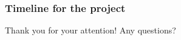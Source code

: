 \documentclass[10pt,xcolor=table]{beamer}
\begin{document}
\begin{frame}
  \frametitle{Timeline for the project}
\begin{table}[tp]
  \caption{Timeline for the project.}
  \label{table:timeline}
  \begin{adjustwidth}{-0.15in}{0.0in}
    \centering
    \footnotesize
  \end{adjustwidth}
\end{table}  
\end{frame}

\begin{frame}{\Large Thank you for your attention!}
  \centering \Large Any questions?
\end{frame}
\end{document}
